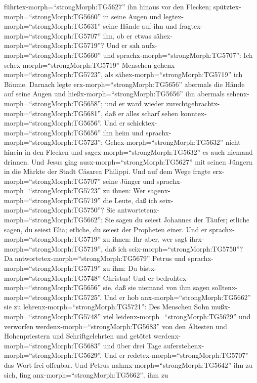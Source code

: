 führtex-morph=``strongMorph:TG5627'' ihn hinaus vor den Flecken;
spütztex-morph=``strongMorph:TG5660'' in seine Augen und
legtex-morph=``strongMorph:TG5631'' seine Hände auf ihn und
fragtex-morph=``strongMorph:TG5707'' ihn, ob er etwas
sähex-morph=``strongMorph:TG5719''?  Und er sah
aufx-morph=``strongMorph:TG5660'' und
sprachx-morph=``strongMorph:TG5707'': Ich
sehex-morph=``strongMorph:TG5719'' Menschen
gehenx-morph=``strongMorph:TG5723'', als
sähex-morph=``strongMorph:TG5719'' ich Bäume.  Darnach
legte erx-morph=``strongMorph:TG5656'' abermals die Hände auf seine
Augen und hießx-morph=``strongMorph:TG5656'' ihn abermals
sehenx-morph=``strongMorph:TG5658''; und er ward wieder
zurechtgebrachtx-morph=``strongMorph:TG5681'', daß er alles scharf sehen
konntex-morph=``strongMorph:TG5656''.  Und er
schicktex-morph=``strongMorph:TG5656'' ihn heim und
sprachx-morph=``strongMorph:TG5723'': Gehex-morph=``strongMorph:TG5632''
nicht hinein in den Flecken und sagex-morph=``strongMorph:TG5632'' es
auch niemand drinnen.  Und Jesus ging
ausx-morph=``strongMorph:TG5627'' mit seinen Jüngern in die Märkte der
Stadt Cäsarea Philippi. Und auf dem Wege fragte
erx-morph=``strongMorph:TG5707'' seine Jünger und
sprachx-morph=``strongMorph:TG5723'' zu ihnen: Wer
sagenx-morph=``strongMorph:TG5719'' die Leute, daß ich
seix-morph=``strongMorph:TG5750''?  Sie
antwortetenx-morph=``strongMorph:TG5662'': Sie sagen du seiest Johannes
der Täufer; etliche sagen, du seiest Elia; etliche, du seiest der
Propheten einer.  Und er
sprachx-morph=``strongMorph:TG5719'' zu ihnen: Ihr aber, wer sagt
ihrx-morph=``strongMorph:TG5719'', daß ich
seix-morph=``strongMorph:TG5750''? Da
antwortetex-morph=``strongMorph:TG5679'' Petrus und
sprachx-morph=``strongMorph:TG5719'' zu ihm: Du
bistx-morph=``strongMorph:TG5748'' Christus!  Und er
bedrohtex-morph=``strongMorph:TG5656'' sie, daß sie niemand von ihm
sagen solltenx-morph=``strongMorph:TG5725''.  Und er hob
anx-morph=``strongMorph:TG5662'' sie zu
lehrenx-morph=``strongMorph:TG5721'': Des Menschen Sohn
mußx-morph=``strongMorph:TG5748'' viel
leidenx-morph=``strongMorph:TG5629'' und verworfen
werdenx-morph=``strongMorph:TG5683'' von den Ältesten und Hohenpriestern
und Schriftgelehrten und getötet werdenx-morph=``strongMorph:TG5683''
und über drei Tage auferstehenx-morph=``strongMorph:TG5629''.
 Und er redetex-morph=``strongMorph:TG5707'' das Wort frei
offenbar. Und Petrus nahmx-morph=``strongMorph:TG5642'' ihn zu sich,
fing anx-morph=``strongMorph:TG5662'', ihm zu
